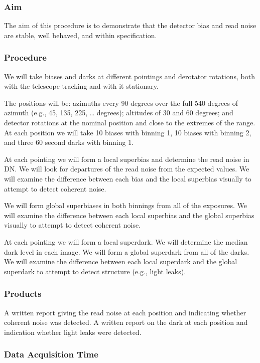 \documentclass{article}
\begin{document}
\subsubsection{Aim}

The aim of this procedure is to demonstrate that the detector bias and read noise are stable, well behaved, and within specification.

\subsubsection{Procedure}

We will take biases and darks at different pointings and derotator rotations, both with the telescope tracking and with it stationary.

The positions will be: azimuths every 90 degrees over the full 540 degrees of azimuth (e.g., 45, 135, 225, {\ldots} degrees); altitudes of 30 and 60 degrees; and detector rotations at the nominal position and close to the extremes of the range. At each position we will take 10 biases with binning 1, 10 biases with binning 2, and three 60 second darks with binning 1.

At each pointing we will form a local superbias and determine the read noise in DN. We will look for departures of the read noise from the expected values. We will examine the difference between each bias and the local superbias visually to attempt to detect coherent noise.

We will form global superbiases in both binnings from all of the exposures. We will examine the difference between each local superbias and the global superbias visually to attempt to detect coherent noise.

At each pointing we will form a local superdark. We will determine the median dark level in each image. We will form a global superdark from all of the darks. We will examine the difference between each local superdark and the global superdark to attempt to detect structure (e.g., light leaks).

\subsubsection{Products}

A written report giving the read noise at each position and indicating whether coherent noise was detected. A written report on the dark at each position and indication whether light leaks were detected.

\subsubsection{Data Acquisition Time}
\end{document}
